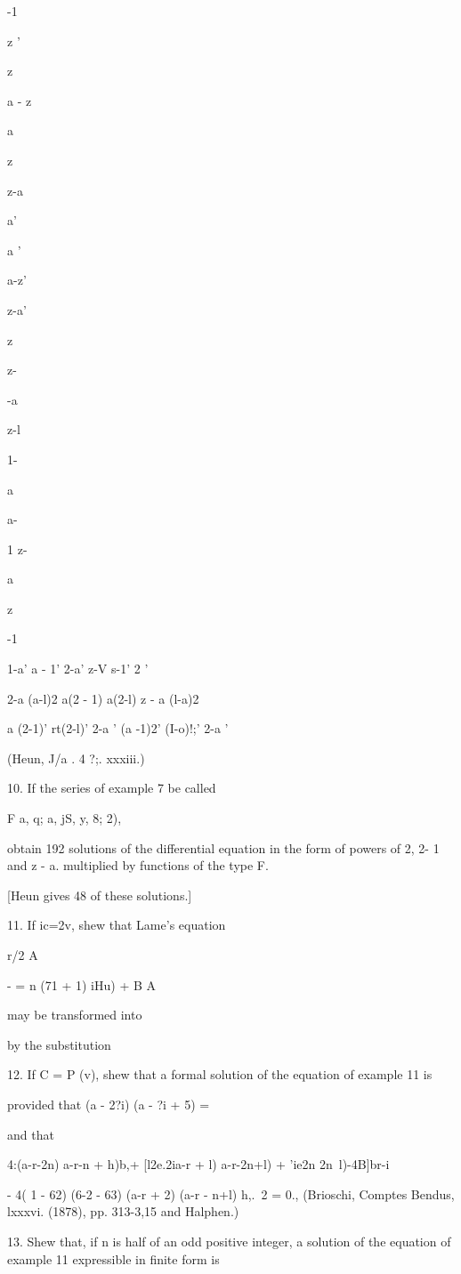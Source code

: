 {{{{{{{{-1

z '

z

a - z



a

z

z-a

a'

a '

a-z'

z-a'

z

z-

-a

z-l

1-

 a

a-

1 z-

 a

z

-1

1-a' a - 1' 2-a' z-V s-1' 2 '

2-a (a-l)2 a(2 - 1) a(2-l) z - a (l-a)2

a (2-1)' rt(2-l)' 2-a ' (a -1)2' (I-o)!;' 2-a '

(Heun, J/a . 4 ?;. xxxiii.)

10. If the series of example 7 be called

F a, q; a, jS, y, 8; 2),

obtain 192 solutions of the differential equation in the form of
powers of 2, 2- 1 and z - a. multiplied by functions of the type F.

[Heun gives 48 of these solutions.]

11. If ic=2v, shew that Lame's equation

r/2 A

- = n (71 + 1) iHu) + B A

may be transformed into

by the substitution

12. If C = P (v), shew that a formal solution of the equation of
example 11 is

provided that (a - 2?i) (a - ?i + 5) =

and that

4:(a-r-2n) a-r-n + h)b,+ [l2e.2ia-r + l) a-r-2n+l) + 'ie2n
2n~l)-4B]br-i

- 4( 1 - 62) (6-2 - 63) (a-r + 2) (a-r - n+l) h,.\ 2 = 0., (Brioschi,
Comptes Bendus, lxxxvi. (1878), pp. 313-3,15 and Halphen.)

13. Shew that, if n is half of an odd positive integer, a solution of
the equation of example 11 expressible in finite form is

}}}}}}}}
